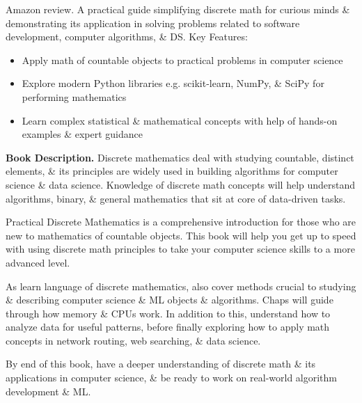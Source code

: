\documentclass{article}
\begin{document}
\begin{enumerate}
	{\sf Amazon review.} A practical guide simplifying discrete math for curious minds \& demonstrating its application in solving problems related to software development, computer algorithms, \& DS. Key Features:
	\begin{itemize}
		\item Apply math of countable objects to practical problems in computer science
		\item Explore modern Python libraries e.g. scikit-learn, NumPy, \& SciPy for performing mathematics
		\item Learn complex statistical \& mathematical concepts with help of hands-on examples \& expert guidance
	\end{itemize}
	{\bf Book Description.} Discrete mathematics deal with studying countable, distinct elements, \& its principles are widely used in building algorithms for computer science \& data science. Knowledge of discrete math concepts will help understand algorithms, binary, \& general mathematics that sit at core of data-driven tasks.
	
	Practical Discrete Mathematics is a comprehensive introduction for those who are new to mathematics of countable objects. This book will help you get up to speed with using discrete math principles to take your computer science skills to a more advanced level.
	
	As learn language of discrete mathematics, also cover methods crucial to studying \& describing computer science \& ML objects \& algorithms. Chaps will guide through how memory \& CPUs work. In addition to this, understand how to analyze data for useful patterns, before finally exploring how to apply math concepts in network routing, web searching, \& data science.
	
	By end of this book, have a deeper understanding of discrete math \& its applications in computer science, \& be ready to work on real-world algorithm development \& ML.
	

\end{enumerate}
\end{document}
